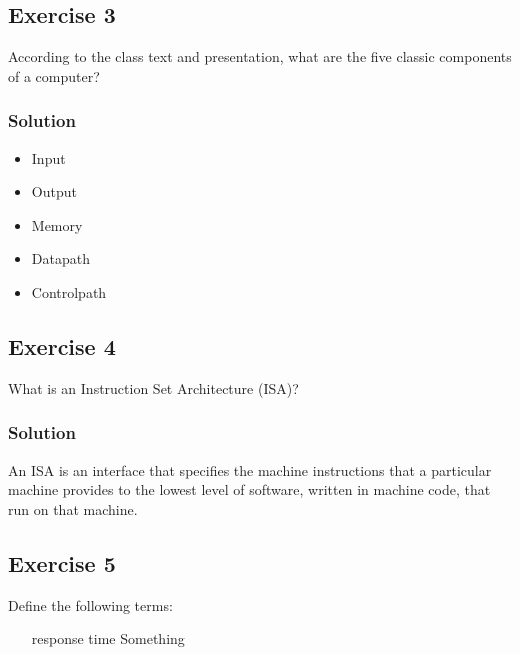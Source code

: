 \documentclass[12pt]{article}
\begin{document}
\subsection*{Exercise 3}
According to the class text and presentation, what are the five classic components of a computer?
\subsubsection*{Solution}
\begin{itemize}
\item Input
\item Output
\item Memory
\item Datapath
\item Controlpath
\end{itemize}

\subsection*{Exercise 4}
What is an Instruction Set Architecture (ISA)?
\subsubsection*{Solution}
An ISA is an interface that specifies the machine instructions that a particular machine provides to the lowest level of software, written in machine code, that run on that machine.

\subsection*{Exercise 5}
Define the following terms:
\begin{itemize}
\item[response time] Something
\end{itemize}
\end{document}

